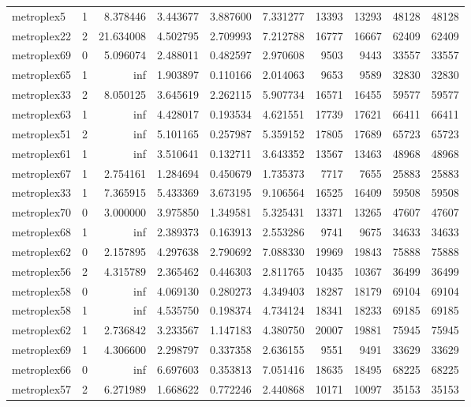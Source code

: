 \begin{longtable}{|l|r|r|r|r|r|r|r|r|r|}
metroplex5 & 1 & 8.378446 & 3.443677 & 3.887600 & 7.331277 & 13393 & 13293 & 48128 & 48128 \\
metroplex22 & 2 & 21.634008 & 4.502795 & 2.709993 & 7.212788 & 16777 & 16667 & 62409 & 62409 \\
metroplex69 & 0 & 5.096074 & 2.488011 & 0.482597 & 2.970608 & 9503 & 9443 & 33557 & 33557 \\
metroplex65 & 1 & inf & 1.903897 & 0.110166 & 2.014063 & 9653 & 9589 & 32830 & 32830 \\
metroplex33 & 2 & 8.050125 & 3.645619 & 2.262115 & 5.907734 & 16571 & 16455 & 59577 & 59577 \\
metroplex63 & 1 & inf & 4.428017 & 0.193534 & 4.621551 & 17739 & 17621 & 66411 & 66411 \\
metroplex51 & 2 & inf & 5.101165 & 0.257987 & 5.359152 & 17805 & 17689 & 65723 & 65723 \\
metroplex61 & 1 & inf & 3.510641 & 0.132711 & 3.643352 & 13567 & 13463 & 48968 & 48968 \\
metroplex67 & 1 & 2.754161 & 1.284694 & 0.450679 & 1.735373 & 7717 & 7655 & 25883 & 25883 \\
metroplex33 & 1 & 7.365915 & 5.433369 & 3.673195 & 9.106564 & 16525 & 16409 & 59508 & 59508 \\
metroplex70 & 0 & 3.000000 & 3.975850 & 1.349581 & 5.325431 & 13371 & 13265 & 47607 & 47607 \\
metroplex68 & 1 & inf & 2.389373 & 0.163913 & 2.553286 & 9741 & 9675 & 34633 & 34633 \\
metroplex62 & 0 & 2.157895 & 4.297638 & 2.790692 & 7.088330 & 19969 & 19843 & 75888 & 75888 \\
metroplex56 & 2 & 4.315789 & 2.365462 & 0.446303 & 2.811765 & 10435 & 10367 & 36499 & 36499 \\
metroplex58 & 0 & inf & 4.069130 & 0.280273 & 4.349403 & 18287 & 18179 & 69104 & 69104 \\
metroplex58 & 1 & inf & 4.535750 & 0.198374 & 4.734124 & 18341 & 18233 & 69185 & 69185 \\
metroplex62 & 1 & 2.736842 & 3.233567 & 1.147183 & 4.380750 & 20007 & 19881 & 75945 & 75945 \\
metroplex69 & 1 & 4.306600 & 2.298797 & 0.337358 & 2.636155 & 9551 & 9491 & 33629 & 33629 \\
metroplex66 & 0 & inf & 6.697603 & 0.353813 & 7.051416 & 18635 & 18495 & 68225 & 68225 \\
metroplex57 & 2 & 6.271989 & 1.668622 & 0.772246 & 2.440868 & 10171 & 10097 & 35153 & 35153 \\

\end{longtable}
